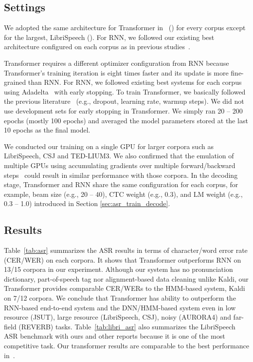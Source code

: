 \subsection{Settings}
\label{sec:asr_setting}
We adopted the same architecture for Transformer in~\cite{Karita2019} () for every corpus except for the largest, LibriSpeech ().
For RNN, we followed our existing best architecture configured on each corpus as in previous studies~\cite{hori2018end,Zeyer2018}.

Transformer requires a different optimizer configuration from RNN because Transformer's training iteration is eight times faster and its update is more fine-grained than RNN. 
For RNN, we followed existing best systems for each corpus using Adadelta~\cite{adadelta} with early stopping. To train Transformer, we basically followed the previous literature~\cite{speech-transformer} (e.g., dropout, learning rate, warmup steps). 
We did not use development sets for early stopping in Transformer. We simply ran 20 -- 200 epochs (mostly 100 epochs) and averaged the model parameters stored at the last 10 epochs as the final model.  

We conducted our training on a single GPU for larger corpora such as LibriSpeech, CSJ and TED-LIUM3. We also confirmed that the emulation of multiple GPUs using accumulating gradients over multiple forward/backward steps~\cite{ott-etal-2018-scaling} could result in similar performance with those corpora.
In the decoding stage, Transformer and RNN share the same configuration for each corpus, for example, beam size (e.g., 20 -- 40), CTC weight  (e.g., 0.3), and LM weight  (e.g., 0.3 -- 1.0) introduced in Section \ref{sec:asr_train_decode}.

\subsection{Results}

Table~\ref{tab:asr} summarizes the ASR results in terms of character/word error rate (CER/WER) on each corpora.
It shows that Transformer outperforms RNN on 13/15 corpora in our experiment.
Although our system has no pronunciation dictionary, part-of-speech tag nor alignment-based data cleaning unlike Kaldi,
our Transformer provides comparable CER/WERs to the HMM-based system, Kaldi on 7/12 corpora.
We conclude that Transformer has ability to outperform the RNN-based end-to-end system and the DNN/HMM-based system even in low resource (JSUT), large resource (LibriSpeech, CSJ), noisy (AURORA4) and far-field (REVERB) tasks.
Table~\ref{tab:libri_asr} also summarizes the LibriSpeech ASR benchmark with ours and other reports because it is one of the most competitive task. Our transformer results are comparable to the best performance in~\cite{irie2019language,luscher2019rwth,park2019specaugment}.

